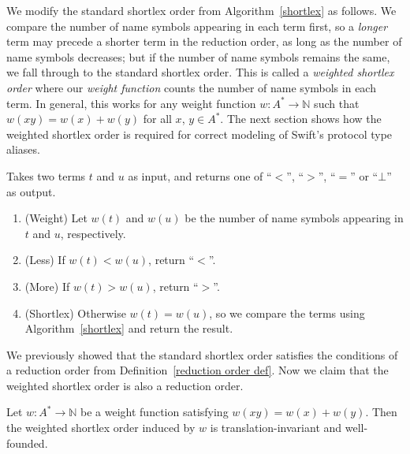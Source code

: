 \documentclass[../generics]{subfiles}
\begin{document}
We modify the standard shortlex order from Algorithm~\ref{shortlex} as follows. We compare the number of name symbols appearing in each term first, so a \emph{longer} term may precede a shorter term in the reduction order, as long as the number of name symbols decreases; but if the number of name symbols remains the same, we fall through to the standard shortlex order. This is called a \emph{weighted shortlex order} where our \emph{weight function} counts the number of name symbols in each term. In general, this works for any weight function $w\colon A^*\rightarrow\mathbb{N}$ such that $w(xy)=w(x)+w(y)$ for all $x$, $y\in A^*$. The next section shows how the weighted shortlex order is required for correct modeling of Swift's protocol type aliases.
\begin{algorithm}\label{rqm reduction order}
Takes two terms $t$ and $u$ as input, and returns one of ``$<$'', ``$>$'', ``$=$'' or \index{$\bot$}``$\bot$'' as output.
\begin{enumerate}
\item (Weight) Let $w(t)$ and $w(u)$ be the number of name symbols appearing in $t$ and $u$, respectively.
\item (Less) If $w(t)<w(u)$, return ``$<$''.
\item (More) If $w(t)>w(u)$, return ``$>$''.
\item (Shortlex) Otherwise $w(t)=w(u)$, so we compare the terms using Algorithm~\ref{shortlex} and return the result.
\end{enumerate}
\end{algorithm}
We previously showed that the standard shortlex order satisfies the conditions of a reduction order from Definition~\ref{reduction order def}. Now we claim that the weighted shortlex order is also a reduction order.
\begin{proposition} Let $w\colon A^*\rightarrow\mathbb{N}$ be a weight function satisfying $w(xy)=w(x)+w(y)$. Then the weighted shortlex order induced by $w$ is translation-invariant and well-founded.
\end{proposition}
\end{document}
